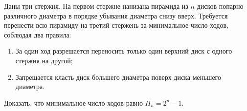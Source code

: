 \begin{problem}
    Даны три стержня. На первом стержне нанизана пирамида из $n$ дисков 
    попарно различного диаметра в порядке убывания диаметра снизу вверх. 
    Требуется перенести всю пирамиду на третий стержень за минимальное 
    число ходов, соблюдая два правила:
    \begin{enumerate}
        \item За один ход разрешается переносить только один верхний диск 
        с одного стержня на другой;
        \item Запрещается класть диск большего диаметра поверх диска 
        меньшего диаметра.
    \end{enumerate}
    Доказать, что минимальное число ходов равно $H_n = 2^n - 1$.
\end{problem}

